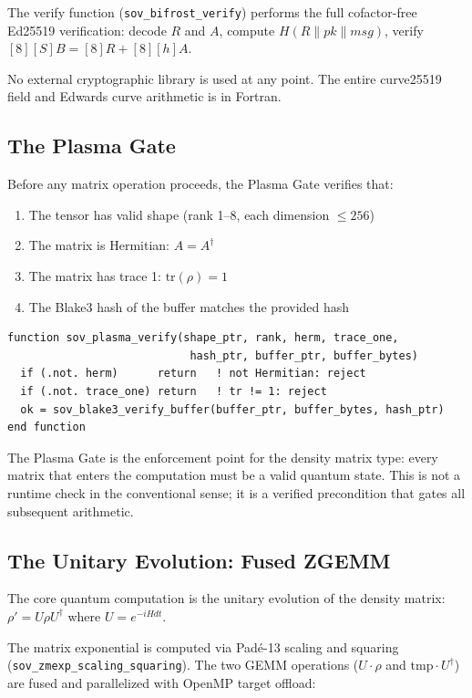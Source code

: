 \documentclass[11pt,a4paper]{article}
\begin{document}
The verify function (\texttt{sov\_bifrost\_verify}) performs the full
cofactor-free Ed25519 verification: decode $R$ and $A$, compute
$H(R \| pk \| msg)$, verify $[8][S]B = [8]R + [8][h]A$.

No external cryptographic library is used at any point. The entire
curve25519 field and Edwards curve arithmetic is in Fortran.

\subsection{The Plasma Gate}

Before any matrix operation proceeds, the Plasma Gate verifies that:
\begin{enumerate}[noitemsep]
\item The tensor has valid shape (rank 1--8, each dimension $\leq 256$)
\item The matrix is Hermitian: $A = A^\dagger$
\item The matrix has trace 1: $\mathrm{tr}(\rho) = 1$
\item The Blake3 hash of the buffer matches the provided hash
\end{enumerate}

\begin{lstlisting}[language={}]
function sov_plasma_verify(shape_ptr, rank, herm, trace_one,
                            hash_ptr, buffer_ptr, buffer_bytes)
  if (.not. herm)      return   ! not Hermitian: reject
  if (.not. trace_one) return   ! tr != 1: reject
  ok = sov_blake3_verify_buffer(buffer_ptr, buffer_bytes, hash_ptr)
end function
\end{lstlisting}

The Plasma Gate is the enforcement point for the density matrix type:
every matrix that enters the computation must be a valid quantum state.
This is not a runtime check in the conventional sense; it is a verified
precondition that gates all subsequent arithmetic.

\subsection{The Unitary Evolution: Fused ZGEMM}

The core quantum computation is the unitary evolution of the density matrix:
$\rho' = U \rho U^\dagger$ where $U = e^{-iHdt}$.

The matrix exponential is computed via Pad\'e-13 scaling and squaring
(\texttt{sov\_zmexp\_scaling\_squaring}). The two GEMM operations
($U \cdot \rho$ and $\mathrm{tmp} \cdot U^\dagger$) are fused and
parallelized with OpenMP target offload:
\end{document}
